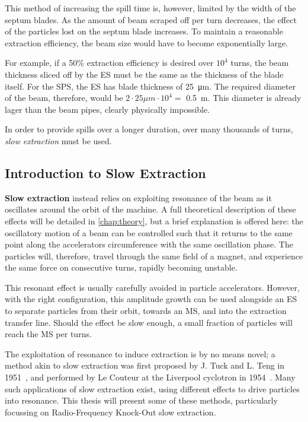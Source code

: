 \documentclass[11pt]{report}
\begin{document}
This method of increasing the spill time is, however, limited by the width of the septum blades. As the amount of beam scraped off per turn decreases, the effect of the particles lost on the septum blade increases. To maintain a reasonable extraction efficiency, the beam size would have to become exponentially large.

For example, if a 50\% extraction efficiency is desired over $10^4$ turns, the beam thickness sliced off by the ES must be the same as the thickness of the blade itself. For the SPS, the ES has blade thickness of \qty{25}{\micro\meter}. The required diameter of the beam, therefore, would be $2\cdot 25\mu m\cdot 10^4 = $ \qty{0.5}{\meter}. This diameter is already lager than the beam pipes, clearly physically impossible.

In order to provide spills over a longer duration, over many thousands of turns, \textit{slow extraction} must be used. 

\subsection{Introduction to Slow Extraction}

\textbf{Slow extraction} instead relies on exploiting resonance of the beam as it oscillates around the orbit of the machine. A full theoretical description of these effects will be detailed in \autoref{chap:theory}, but a brief explanation is offered here: the oscillatory motion of a beam can be controlled such that it returns to the same point along the accelerators circumference with the same oscillation phase. The particles will, therefore, travel through the same field of a magnet, and experience the same force on consecutive turns, rapidly becoming unstable.

This resonant effect is usually carefully avoided in particle accelerators. However, with the right configuration, this amplitude growth can be used alongside an ES to separate particles from their orbit, towards an MS, and into the extraction transfer line. Should the effect be slow enough, a small fraction of particles will reach the MS per turns.

The exploitation of resonance to induce extraction is by no means novel; a method akin to slow extraction was first proposed by J. Tuck and L. Teng in 1951~\cite{Couteur_1951}, and performed by Le Couteur at the Liverpool cyclotron in 1954~\cite{Couteur_1955}. Many such applications of slow extraction exist, using different effects to drive particles into resonance. This thesis will present some of these methods, particularly focussing on Radio-Frequency Knock-Out slow extraction.
\end{document}
